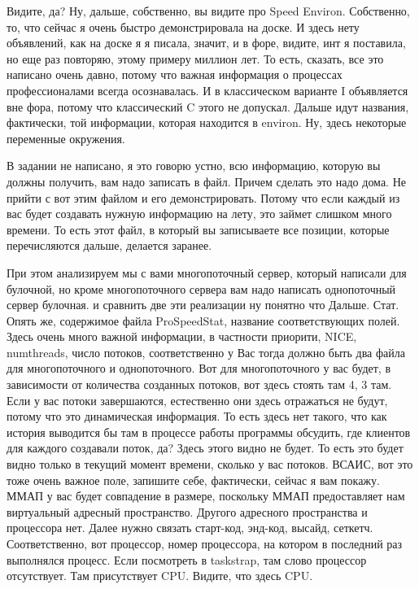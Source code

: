 \documentclass[12pt]{article} %
\begin{document}

Видите, да?  Ну, дальше, собственно, вы видите про Speed Environ.  Собственно, то, что сейчас я очень быстро демонстрировала на доске.  И здесь нету объявлений, как на доске я я писала, значит, и в форе, видите, инт я поставила, но еще раз повторяю, этому примеру миллион лет.  То есть, сказать, все это написано очень давно, потому что важная информация о процессах профессионалами всегда осознавалась.  И в классическом варианте I объявляется вне фора, потому что классический C этого не допускал.  Дальше идут названия, фактически, той информации, которая находится в environ.  Ну, здесь некоторые переменные окружения.  

В задании не написано, я это говорю устно, всю информацию, которую вы должны получить, вам надо записать в файл.  Причем сделать это надо дома. Не прийти с вот этим файлом и его демонстрировать.  Потому что если каждый из вас будет создавать нужную информацию на лету, это займет слишком много времени.  То есть этот файл, в который вы записываете все позиции, которые перечисляются дальше, делается заранее.  

При этом анализируем мы с вами многопоточный сервер, который написали для булочной, но кроме многопоточного сервера вам надо написать однопоточный сервер булочная.  и сравнить две эти реализации ну понятно что Дальше. Стат. Опять же, содержимое файла ProSpeedStat, название соответствующих полей.  Здесь очень много важной информации, в частности приорити, NICE, numthreads, число потоков, соответственно у Вас тогда должно быть два файла для многопоточного и однопоточного.  Вот для многопоточного у вас будет, в зависимости от количества созданных потоков, вот здесь стоять там 4, 3 там.  Если у вас потоки завершаются, естественно они здесь отражаться не будут, потому что это динамическая информация.  То есть здесь нет такого, что как история выводится бы там в процессе работы программы обсудить, где клиентов для каждого создавали поток, да?  Здесь этого видно не будет. То есть это будет видно только в текущий момент времени, сколько у вас потоков.  ВСАИС, вот это тоже очень важное поле, запишите себе, фактически, сейчас я вам покажу.  ММАП у вас будет совпадение в размере, поскольку ММАП предоставляет нам виртуальный адресный пространство. Другого адресного пространства и процессора нет.  Далее нужно связать старт-код, энд-код, высайд, сеткетч.  Соответственно, вот процессор, номер процессора, на котором в последний раз выполнялся процесс.  Если посмотреть в taskstrap, там слово процессор отсутствует.  Там присутствует CPU.  Видите, что здесь CPU.
\end{document}

